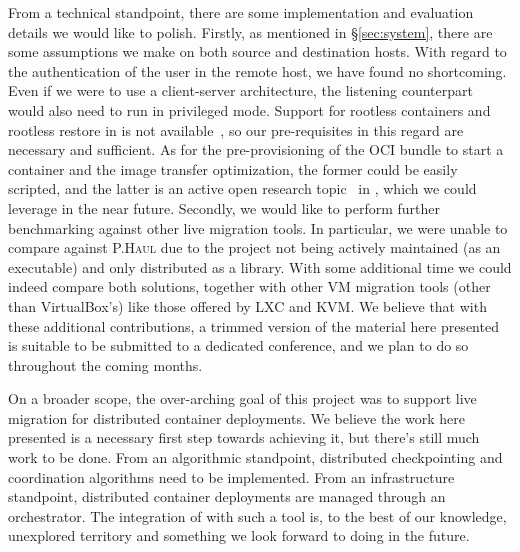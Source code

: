 From a technical standpoint, there are some implementation and evaluation details we would like to polish.
Firstly, as mentioned in \S\ref{sec:system}, there are some assumptions we make on both source and destination hosts.
With regard to the authentication of the user in the remote host, we have found no shortcoming.
Even if we were to use a client-server architecture, the listening counterpart would also need to run in privileged mode.
Support for rootless containers and rootless restore in \criu is not available~\cite{criu-rootless1,criu-rootless2}, so our pre-requisites in this regard are necessary and sufficient.
As for the pre-provisioning of the OCI bundle to start a \runc container and the image transfer optimization, the former could be easily scripted, and the latter is an active open research topic~\cite{criu-image-streamer} in \criu, which we could leverage in the near future.
Secondly, we would like to perform further benchmarking against other live migration tools.
In particular, we were unable to compare against \textsc{P.Haul} due to the project not being actively maintained (as an executable) and only distributed as a library.
With some additional time we could indeed compare both solutions, together with other VM migration tools (other than VirtualBox's) like those offered by LXC and KVM.
We believe that with these additional contributions, a trimmed version of the material here presented is suitable to be submitted to a dedicated conference, and we plan to do so throughout the coming months.

On a broader scope, the over-arching goal of this project was to support live migration for distributed container deployments.
We believe the work here presented is a necessary first step towards achieving it, but there's still much work to be done.
From an algorithmic standpoint, distributed checkpointing and coordination algorithms need to be implemented.
From an infrastructure standpoint, distributed container deployments are managed through an orchestrator.
The integration of \criu with such a tool is, to the best of our knowledge, unexplored territory and something we look forward to doing in the future.
